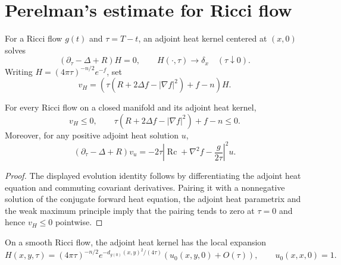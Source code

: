 \section{Perelman's estimate for Ricci flow}

\begin{definition}
\label{def:chow-ii-ch16-adjoint-heat-kernel}

For a Ricci flow $g(t)$ and $\tau=T-t$, an adjoint heat kernel centered at
$(x,0)$ solves
\[
\left(\partial_\tau-\Delta+R\right)H=0,
\qquad H(\cdot,\tau)\longrightarrow\delta_x\quad(\tau\downarrow0).
\]
Writing $H=(4\pi\tau)^{-n/2}e^{-f}$, set
\[
v_H=\left(\tau(R+2\Delta f-|\nabla f|^2)+f-n\right)H.
\]
\end{definition}

\begin{theorem}
\label{thm:chow-ii-ch16-perelman-harnack}


For every Ricci flow on a closed manifold and its adjoint heat kernel,
\[
v_H\le0,\qquad
\tau(R+2\Delta f-|\nabla f|^2)+f-n\le0.
\]
Moreover, for any positive adjoint heat solution $u$,
\[
\left(\partial_\tau-\Delta+R\right)v_u
 =-2\tau\left|\operatorname{Rc}+\nabla^2f-\frac{g}{2\tau}\right|^2u.
\]
\end{theorem}
\begin{proof}
\sketch The displayed evolution identity follows by differentiating the adjoint heat
equation and commuting covariant derivatives. Pairing it with a nonnegative
solution of the conjugate forward heat equation, the adjoint heat parametrix
and the weak maximum principle imply that the pairing tends to zero at
$\tau=0$ and hence $v_H\le0$ pointwise.
\end{proof}

\begin{theorem}
\label{thm:chow-ii-ch16-adjoint-parametrix}


On a smooth Ricci flow, the adjoint heat kernel has the local expansion
\[
H(x,y,\tau)=(4\pi\tau)^{-n/2}e^{-d_{g(0)}(x,y)^2/(4\tau)}
 (u_0(x,y,0)+O(\tau)),\qquad u_0(x,x,0)=1.
\]
\end{theorem}

